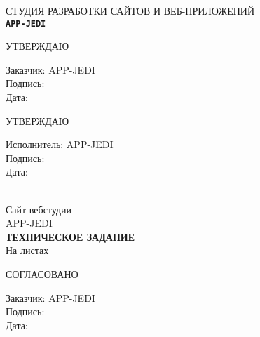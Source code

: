 %
\begin{center}
{\Large {{СТУДИЯ РАЗРАБОТКИ САЙТОВ И ВЕБ-ПРИЛОЖЕНИЙ \\ \texttt{\LARGE \bf APP-JEDI}}}}\\[1cm]

\begin{minipage}{\textwidth}
  \begin{minipage}{0.5\textwidth}
    \begin{flushleft}
      \begin{center}
        {\large УТВЕРЖДАЮ}\\
      \end{center}
      Заказчик: APP-JEDI\\
      Подпись:\\
      Дата:
    \end{flushleft}
  \end{minipage}
  \begin{minipage}{0.5\textwidth}
    \begin{flushleft}
      \begin{center}
        {\large УТВЕРЖДАЮ}\\
      \end{center}
      Исполнитель: APP-JEDI\\
      Подпись:\\
      Дата:
    \end{flushleft}
  \end{minipage}
\end{minipage}
\\[4cm]
{\huge Сайт вебстудии} \\ %
{\LARGE APP-JEDI } \\[0.5cm]
{ \Huge \bf ТЕХНИЧЕСКОЕ ЗАДАНИЕ }\\[1.5cm]

На \pageref{LastPage} листах\\[2cm]
\begin{flushleft}
\begin{minipage}{0.5\textwidth}
\begin{center}
  СОГЛАСОВАНО
\end{center}
    Заказчик: APP-JEDI\\
    Подпись:\\
    Дата:
\end{minipage}
\end{flushleft}
\end{center}
\thispagestyle{empty}
